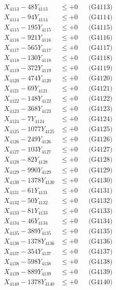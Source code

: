 \documentclass[a4paper,10pt]{article}
\begin{document}
{\begin{align}
X_{4113} - 48Y_{4113} &\leq +0 && \text{(G4113)} \\
X_{4114} - 94Y_{4114} &\leq +0 && \text{(G4114)} \\
X_{4115} - 195Y_{4115} &\leq +0 && \text{(G4115)} \\
X_{4116} - 921Y_{4116} &\leq +0 && \text{(G4116)} \\
X_{4117} - 565Y_{4117} &\leq +0 && \text{(G4117)} \\
X_{4118} - 130Y_{4118} &\leq +0 && \text{(G4118)} \\
X_{4119} - 372Y_{4119} &\leq +0 && \text{(G4119)} \\
X_{4120} - 474Y_{4120} &\leq +0 && \text{(G4120)} \\
\allowbreak
X_{4121} - 69Y_{4121} &\leq +0 && \text{(G4121)} \\
X_{4122} - 148Y_{4122} &\leq +0 && \text{(G4122)} \\
X_{4123} - 368Y_{4123} &\leq +0 && \text{(G4123)} \\
X_{4124} - 7Y_{4124} &\leq +0 && \text{(G4124)} \\
X_{4125} - 1077Y_{4125} &\leq +0 && \text{(G4125)} \\
X_{4126} - 249Y_{4126} &\leq +0 && \text{(G4126)} \\
X_{4127} - 103Y_{4127} &\leq +0 && \text{(G4127)} \\
X_{4128} - 82Y_{4128} &\leq +0 && \text{(G4128)} \\
X_{4129} - 990Y_{4129} &\leq +0 && \text{(G4129)} \\
X_{4130} - 1378Y_{4130} &\leq +0 && \text{(G4130)} \\
\allowbreak
X_{4131} - 61Y_{4131} &\leq +0 && \text{(G4131)} \\
X_{4132} - 50Y_{4132} &\leq +0 && \text{(G4132)} \\
X_{4133} - 81Y_{4133} &\leq +0 && \text{(G4133)} \\
X_{4134} - 46Y_{4134} &\leq +0 && \text{(G4134)} \\
X_{4135} - 389Y_{4135} &\leq +0 && \text{(G4135)} \\
X_{4136} - 1378Y_{4136} &\leq +0 && \text{(G4136)} \\
X_{4137} - 354Y_{4137} &\leq +0 && \text{(G4137)} \\
X_{4138} - 598Y_{4138} &\leq +0 && \text{(G4138)} \\
X_{4139} - 889Y_{4139} &\leq +0 && \text{(G4139)} \\
X_{4140} - 1378Y_{4140} &\leq +0 && \text{(G4140)} \\

\end{align}}
\end{document}

